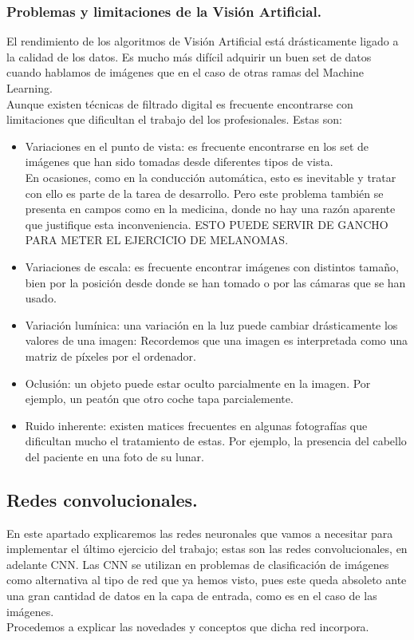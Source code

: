 \documentclass[a4paper,10pt]{article}
\begin{document}
\subsubsection{Problemas y limitaciones de la Visión Artificial.}
El rendimiento de los algoritmos de Visión Artificial está drásticamente ligado a la calidad de los datos. Es mucho más difícil adquirir un buen set de datos cuando hablamos de imágenes que en el caso de otras ramas del Machine Learning.
\\Aunque existen técnicas de filtrado digital es frecuente encontrarse con limitaciones que dificultan el trabajo del los profesionales. Estas son:
\begin{itemize}
\item Variaciones en el punto de vista: es frecuente encontrarse en los set de imágenes que han sido tomadas desde diferentes tipos de vista. \\En ocasiones, como en la conducción automática, esto es inevitable y tratar con ello es parte de la tarea de desarrollo. Pero este problema también se presenta en campos como en la medicina, donde no hay una razón aparente que justifique esta inconveniencia. ESTO PUEDE SERVIR DE GANCHO PARA METER EL EJERCICIO DE MELANOMAS.
\item Variaciones de escala: es frecuente encontrar imágenes con distintos tamaño, bien por la posición desde donde se han tomado o por las cámaras que se han usado.
\item Variación lumínica: una variación en la luz puede cambiar drásticamente los valores de una imagen: Recordemos que una imagen es interpretada como una matriz de píxeles por el ordenador.
\item Oclusión:  un objeto puede estar oculto parcialmente en la imagen. Por ejemplo, un peatón que otro coche tapa parcialemente.
\item Ruido inherente: existen matices frecuentes en algunas fotografías que dificultan mucho el tratamiento de estas. Por ejemplo, la presencia del cabello del paciente en una foto de su lunar.

\end{itemize}



\newpage
\subsection{Redes convolucionales.}
En este apartado explicaremos las redes neuronales que vamos a necesitar para implementar el último ejercicio del trabajo; estas son las redes convolucionales, en adelante CNN. Las CNN se utilizan en problemas de clasificación de imágenes como alternativa al tipo de red que ya hemos visto, pues este queda absoleto ante una gran cantidad de datos en la capa de entrada, como es en el caso de las imágenes.\\ Procedemos a explicar las novedades y conceptos que dicha red incorpora.\\
\end{document}
